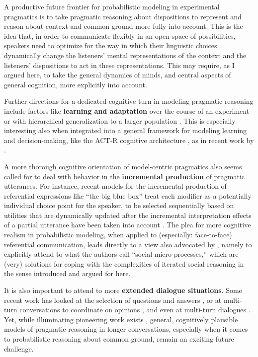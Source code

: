 \documentclass[fleqn,reqno,12pt]{article}
\newcommand{\real}{\acro{real}}
\begin{document}
A productive future frontier for probabilistic modeling in experimental pragmatics is to take pragmatic reasoning about dispositions to represent and reason about context and common ground more fully into account.
This is the idea that, in order to communicate flexibly in an open space of possibilities, speakers need to optimize for the way in which their linguistic choices dynamically change the listeners' mental representations of the context and the listeners' dispositions to act in these representations.
This may require, as I argued here, to take the general dynamics of minds, and central aspects of general cognition, more explicitly into account.

Further directions for a dedicated cognitive turn in modeling pragmatic reasoning include factors like \textbf{learning and adaptation} over the course of an experiment \citep[][]{SchusterDegen2020:I-know-what-you} or with hierarchical generalization to a larger population \citep{HawkinsFranke2023:From-partners-t}.
This is especially interesting also when integrated into a general framework for modeling learning and decision-making, like the ACT-R cognitive architecture \citep{Anderson1993:Rules-of-the-Mi,AndersonBothell2004:An-Integrated-T}, as in recent work by \citet{DuffMayn2026:The-Role-of-Rei}.

A more thorough cognitive orientation of model-centric pragmatics also seems called for to deal with \real behavior in the \textbf{incremental production} of pragmatic utterances.
For instance, recent models for the incremental production of referential expressions like ``the big blue box'' treat each modifier as a potentially individual choice point for the speaker, to be selected sequentially based on utilities that are dynamically updated after the incremental interpretation effects of a partial utterance have been taken into account \citep{Cohn-GordonGoodman2019:An-Incremental-,SchlotterbeckWang2023:An-incremental-}.
The plea for more cognitive realism in probabilistic modeling, when applied to (especially: face-to-face) referential communication, leads directly to a view also advocated by \citet{Rubio-FernandezBerke2025:Tracking-minds-}, namely to explicitly attend to what the authors call ``social micro-processes,'' which are (very) \real solutions for coping with the complexities of iterated social reasoning in the sense introduced and argued for here.

It is also important to attend to more \textbf{extended dialogue situations}.
Some recent work has looked at the selection of questions and answers \citep{HawkinsStuhlmuller2015:Why-do-you-ask-,HawkinsTsvilodub2025:Relevant-answer}, or at multi-turn conversations to coordinate on opinions \citep{AchimovaScontras2022:Learning-about-,AchimovaFranke2025:The-alignment-m}, and even at multi-turn dialogues \citep{DasDuff2026:Planning-Ahead-}.
Yet, while illuminating pioneering work exists \citep[][]{Anderson2021:Tell-Me-Everyth,QingGoodman2016:A-Rational-Spee}, general, cognitively plausible models of \real pragmatic reasoning in longer conversations, especially when it comes to probabilistic reasoning about common ground, remain an exciting future challenge.
\end{document}

